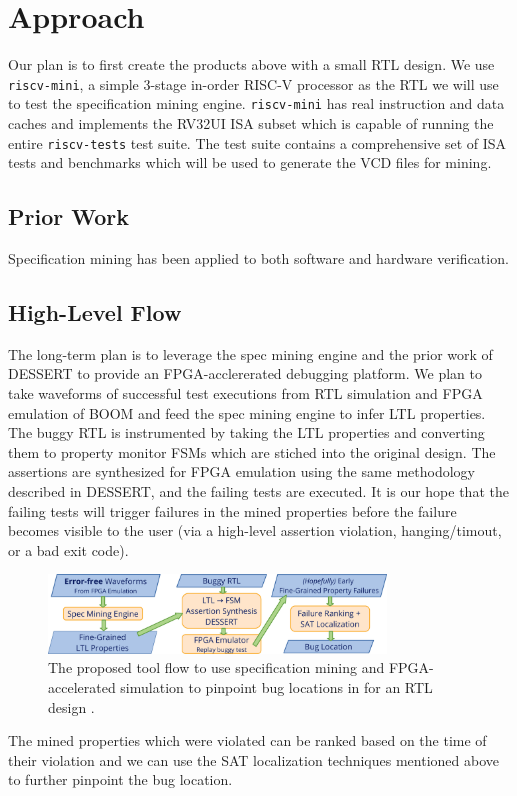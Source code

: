 \documentclass[acmlarge,11pt]{acmart}
\begin{document}
\section{Approach}
Our plan is to first create the products above with a small RTL design.
We use \texttt{riscv-mini}\cite{riscv-mini}, a simple 3-stage in-order RISC-V processor as the RTL we will use to test the specification mining engine.
\texttt{riscv-mini} has real instruction and data caches and implements the RV32UI ISA subset which is capable of running the entire \texttt{riscv-tests}\cite{riscv-tests} test suite.
The test suite contains a comprehensive set of ISA tests and benchmarks which will be used to generate the VCD files for mining.

\subsection{Prior Work}
Specification mining has been applied to both software and hardware verification.

\subsection{High-Level Flow}
The long-term plan is to leverage the spec mining engine and the prior work of DESSERT to provide an FPGA-acclererated debugging platform.
We plan to take waveforms of successful test executions from RTL simulation and FPGA emulation of BOOM and feed the spec mining engine to infer LTL properties.
The buggy RTL is instrumented by taking the LTL properties and converting them to property monitor FSMs which are stiched into the original design.
The assertions are synthesized for FPGA emulation using the same methodology described in DESSERT, and the failing tests are executed.
It is our hope that the failing tests will trigger failures in the mined properties before the failure becomes visible to the user (via a high-level assertion violation, hanging/timout, or a bad exit code).
\begin{figure}[H]
  \centering
  \includegraphics[width=0.8\textwidth]{figs/proposed_approach.pdf}
  \caption{The proposed tool flow to use specification mining and FPGA-accelerated simulation to pinpoint bug locations in for an RTL design .}
  \label{fig:proposed_approach}
\end{figure}
The mined properties which were violated can be ranked based on the time of their violation and we can use the SAT localization techniques mentioned above to further pinpoint the bug location.
\end{document}
